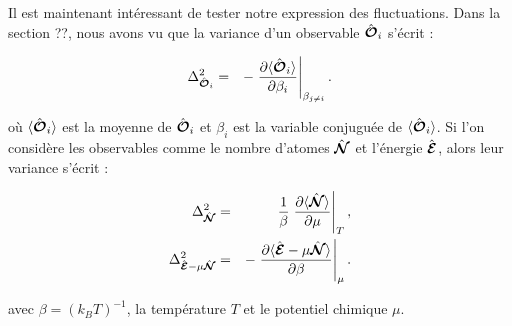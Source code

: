 {%


}

Il est maintenant intéressant de tester notre expression des fluctuations. 
Dans la section {??}, nous avons vu que la variance d'un observable \( \hat{\bm{\mathcal{O}}}_i \) s'écrit :

\begin{eqnarray*}
    \Delta_{\hat{\bm{\mathcal{O}}}_i}^2 &=& - \left. \frac{\partial \langle \hat{\bm{\mathcal{O}}}_i \rangle}{\partial \beta_i} \right|_{\beta_{j \neq i}}.
\end{eqnarray*}

où \( \langle \hat{\bm{\mathcal{O}}}_i \rangle \) est la moyenne de \( \hat{\bm{\mathcal{O}}}_i \) et \( \beta_i \) est la variable conjuguée de \( \langle \hat{\bm{\mathcal{O}}}_i \rangle \). Si l'on considère les observables comme le nombre d'atomes \( \hat{\bm{\mathcal{N}}} \) et l'énergie \( \hat{\bm{\mathcal{E}}} \), alors leur variance s'écrit :

\begin{eqnarray*}
    \Delta_{\hat{\bm{\mathcal{N}}}}^2 &=& \frac{1}{\beta} \left. \frac{\partial \langle \hat{\bm{\mathcal{N}}} \rangle}{\partial \mu} \right|_T, \\
    \Delta_{\hat{\bm{\mathcal{E}}} - \mu \hat{\bm{\mathcal{N}}}}^2 &=& - \left. \frac{\partial \langle \hat{\bm{\mathcal{E}}} - \mu \hat{\bm{\mathcal{N}}} \rangle}{\partial \beta} \right|_\mu.
\end{eqnarray*}

avec \( \beta = (k_B T)^{-1} \), la température \( T \) et le potentiel chimique \( \mu \).


